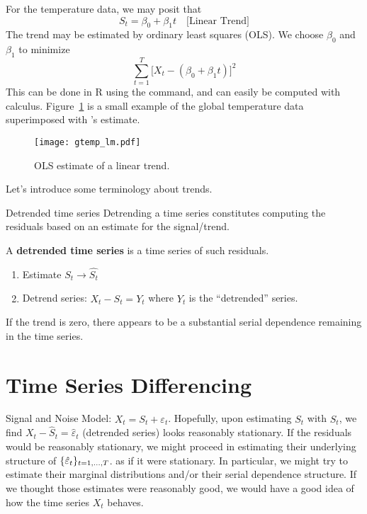 For the temperature data, we may posit that
\[ S_t=\beta_0+\beta_1 t\quad\text{[Linear Trend]} \]
The trend may be estimated by ordinary least squares (OLS).
We choose $ \beta_0 $ and $ \beta_1 $ to minimize
\[ \sum_{t=1}^{T} \bigl[X_t-(\beta_0+\beta_1 t)\bigr]^2 \]
This can be done in R using the  command, and
can easily be computed with calculus. Figure~\ref{fig:gtemp_lm}
is a small example of the global temperature data superimposed
with 's estimate.
\begin{figure}[!ht]
    \centering
    \texttt{[image: gtemp\_lm.pdf]}
    \caption{OLS estimate of a linear trend.}\label{fig:gtemp_lm}
\end{figure}
Let's introduce some terminology about trends.
\begin{Definition}{Detrended time series}{}
    Detrending a time series constitutes computing the
    residuals based on an estimate for the signal/trend.

    A \textbf{detrended time series} is a time series of such residuals.
    \begin{enumerate}
        \item Estimate $ S_t\to \hat{S_t} $
        \item Detrend series: $ X_t-\hat{S_t}=Y_t $
              where $ Y_t $ is the ``detrended'' series.
    \end{enumerate}
\end{Definition}

If the trend is zero, there appears to be a substantial serial
dependence remaining in the time series.

\section{Time Series Differencing}
Signal and Noise Model: $ X_t=S_t+\varepsilon_t $. Hopefully,
upon estimating $ S_t $ with $ \hat{S}_t $,
we find $ X_t-\hat{S}_t=\hat{\varepsilon}_t $ (detrended series)
looks reasonably stationary. If the residuals would be
reasonably stationary, we might
proceed in estimating their underlying structure of $ \{\hat{\varepsilon}_t\}_{t=1,\ldots,T} $.
as if it were stationary. {\color{blue}In particular, we might try to estimate their marginal
        distributions and/or their serial dependence structure. If we thought those estimates
        were reasonably good, we would have a good idea of how the time series $ X_t $ behaves.}

